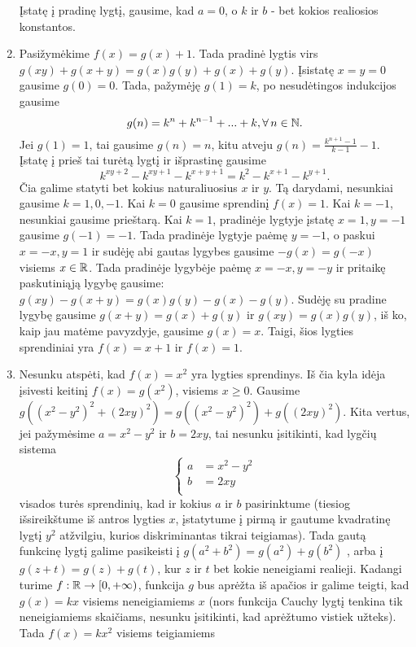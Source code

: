 \begin{enumerate}
    Įstatę į pradinę lygtį, gausime, kad $a=0$, o $k$ ir $b$ - bet kokios
    realiosios konstantos.
\item
    Pasižymėkime $f(x)=g(x)+1$. Tada pradinė lygtis virs
    $g(xy)+g(x+y)=g(x)g(y)+g(x)+g(y)$. Įsistatę $x=y=0$ gausime $g(0)=0$.
    Tada, pažymėję $g(1)=k$, po nesudėtingos indukcijos gausime
    $$g(n)=k^{n}+k^{n-1}+...+k, \forall \, n\in\mathbb N.$$ Jei $g(1)=1$, tai gausime
    $g(n)=n$, kitu atveju $g(n)=\frac{k^{n+1}-1}{k-1}-1$. Įstatę į
    prieš tai turėtą lygtį ir išprastinę gausime
    $$k^{xy+2}-k^{xy+1}-k^{x+y+1}=k^{2}-k^{x+1}-k^{y+1}.$$ Čia galime
    statyti bet kokius naturaliuosius $x$ ir $y$. Tą darydami, nesunkiai
    gausime $k=1,0,-1$. Kai $k=0$ gausime sprendinį $f(x)=1$. Kai $k=-1$,
    nesunkiai gausime prieštarą. Kai $k=1$, pradinėje lygtyje įstatę $x=1,
    y=-1$ gausime $g(-1)=-1$. Tada pradinėje lygtyje paėmę $y=-1$, o
    paskui $x=-x, y=1$ ir sudėję abi gautas lygybes gausime $-g(x)=g(-x)$
    visiems $x\in\mathbb R$. Tada pradinėje lygybėje paėmę $x=-x,y=-y$ ir
    pritaikę paskutiniąją lygybę gausime:
    $g(xy)-g(x+y)=g(x)g(y)-g(x)-g(y)$. Sudėję su pradine lygybę
    gausime $g(x+y)=g(x)+g(y)$ ir $g(xy)=g(x)g(y)$, iš ko, kaip jau matėme
    pavyzdyje, gausime $g(x)=x$. Taigi, šios lygties sprendiniai yra
    $f(x)=x+1$ ir $f(x)=1$.
\item
    Nesunku atspėti, kad $f(x)=x^2$ yra lygties sprendinys. Iš čia kyla
    idėja įsivesti keitinį $f(x)=g(x^2)$, visiems $x\geq 0$. Gausime
    $g((x^2-y^2)^2+(2xy)^2)=g((x^2-y^2)^2)+g((2xy)^2)$. Kita vertus, jei
    pažymėsime $a=x^2-y^2$ ir $b=2xy$, tai nesunku įsitikinti, kad lygčių
    sistema
    $$\left\{\begin{array}{cc}
    a&=x^2-y^2\\
    b&=2xy\\
    \end{array}  \right.$$ visados turės sprendinių, kad ir kokius $a$ ir
    $b$ pasirinktume (tiesiog išsireikštume iš antros lygties $x$,
    įstatytume į pirmą ir gautume kvadratinę lygtį $y^2$ atžvilgiu, kurios
    diskriminantas tikrai teigiamas). Tada gautą funkcinę lygtį galime
    pasikeisti į $g(a^2+b^2)=g(a^2)+g(b^2)$ , arba į $g(z+t)=g(z)+g(t)$,
    kur $z$ ir $t$ bet kokie neneigiami realieji. Kadangi turime
    $f:\mathbb R\rightarrow[0,+\infty)$, funkcija $g$ bus aprėžta iš apačios ir
    galime teigti, kad $g(x)=kx$ visiems neneigiamiems $x$ (nors funkcija
    Cauchy lygtį tenkina tik neneigiamiems skaičiams, nesunku įsitikinti,
    kad aprėžtumo vistiek užteks). Tada $f(x)=kx^2$ visiems teigiamiems

\end{enumerate}
